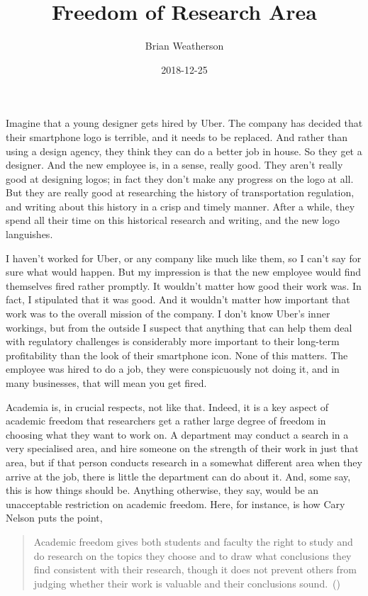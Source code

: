 \documentclass[
  11pt,
  letterpaper,
  DIV=11,
  numbers=noendperiod]{scrartcl}
\title{Freedom of Research Area}
\author{Brian Weatherson}
\date{2018-12-25}
\begin{document}
\maketitle
Imagine that a young designer gets hired by Uber. The company has
decided that their smartphone logo is terrible, and it needs to be
replaced. And rather than using a design agency, they think they can do
a better job in house. So they get a designer. And the new employee is,
in a sense, really good. They aren't really good at designing logos; in
fact they don't make any progress on the logo at all. But they are
really good at researching the history of transportation regulation, and
writing about this history in a crisp and timely manner. After a while,
they spend all their time on this historical research and writing, and
the new logo languishes.

I haven't worked for Uber, or any company like much like them, so I
can't say for sure what would happen. But my impression is that the new
employee would find themselves fired rather promptly. It wouldn't matter
how good their work was. In fact, I stipulated that it was good. And it
wouldn't matter how important that work was to the overall mission of
the company. I don't know Uber's inner workings, but from the outside I
suspect that anything that can help them deal with regulatory challenges
is considerably more important to their long-term profitability than the
look of their smartphone icon. None of this matters. The employee was
hired to do a job, they were conspicuously not doing it, and in many
businesses, that will mean you get fired.

Academia is, in crucial respects, not like that. Indeed, it is a key
aspect of academic freedom that researchers get a rather large degree of
freedom in choosing what they want to work on. A department may conduct
a search in a very specialised area, and hire someone on the strength of
their work in just that area, but if that person conducts research in a
somewhat different area when they arrive at the job, there is little the
department can do about it. And, some say, this is how things should be.
Anything otherwise, they say, would be an unacceptable restriction on
academic freedom. Here, for instance, is how Cary Nelson puts the point,

\begin{quote}
Academic freedom gives both students and faculty the right to study and
do research on the topics they choose and to draw what conclusions they
find consistent with their research, though it does not prevent others
from judging whether their work is valuable and their conclusions
sound.~()
\end{quote}
\end{document}
